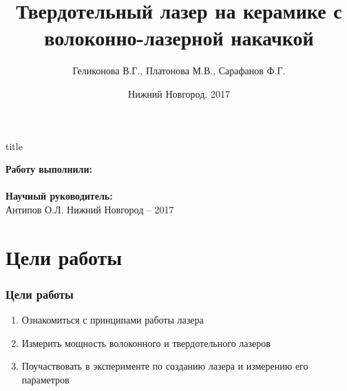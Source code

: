 \documentclass[10pt,pdf,hyperref={unicode}, dvipsnames]{beamer}
\title[]{Твердотельный лазер на керамике с волоконно-лазерной накачкой}
\author{%
	Геликонова В.Г., %
	Платонова М.В., %
	Сарафанов Ф.Г. %
}
\institute{Радиофизический факультет ННГУ, 420 группа}
\date{Нижний Новгород, 2017}
\begin{document}
  

\begin{frame}[plain]
	\centering
	\vspace{2cm}
	\begin{beamercolorbox}[sep=8pt,center]{title}
		\bf{}\inserttitle
	\end{beamercolorbox}
	\vspace{0.5cm}
	\normalsize \textbf{Работу выполнили:}\\
	\large\insertauthor\\ 
	\vspace{0.5cm}
	\normalsize{\textbf{Научный руководитель:}\\}
	\large{Антипов О.Л.}
	\vfill
	\small{Нижний Новгород -- 2017}
\end{frame}
\section{Цели работы}
\begin{frame}[t]
	\frametitle{Цели работы}
	\vfill
\begin{spacing}{1}
	\begin{enumerate}
		\item Ознакомиться с принципами работы  лазера
		\item Измерить мощность волоконного и твердотельного лазеров
		\item Поучаствовать в эксперименте по созданию лазера и измерению его параметров	
	\end{enumerate}
\end{spacing}
	\vfill
\end{frame}
\end{document}
